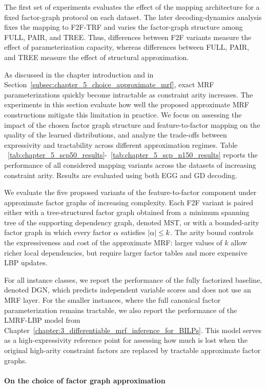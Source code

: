 The first set of experiments evaluates the effect of the mapping architecture for a fixed factor-graph protocol on each dataset. The later decoding-dynamics analysis fixes the mapping to F2F-TRF and varies the factor-graph structure among FULL, PAIR, and TREE. Thus, differences between F2F variants measure the effect of parameterization capacity, whereas differences between FULL, PAIR, and TREE measure the effect of structural approximation.

As discussed in the chapter introduction and in Section~\ref{subsec:chapter_5_choice_approximate_mrf}, exact MRF parameterizations quickly become intractable as constraint arity increases. The experiments in this section evaluate how well the proposed approximate MRF constructions mitigate this limitation in practice. We focus on assessing the impact of the chosen factor graph structure and feature-to-factor mapping on the quality of the learned distributions, and analyze the trade-offs between expressivity and tractability across different approximation regimes. Table ~\ref{tab:chapter_5_scp50_results}-~\ref{tab:chapter_5_scp_n150_results} reports the performance of all considered mapping variants across the datasets of increasing constraint arity. Results are evaluated using both EGG and GD decoding.

We evaluate the five proposed variants of the feature-to-factor component under approximate factor graphs of increasing complexity. Each F2F variant is paired either with a tree-structured factor graph obtained from a minimum spanning tree of the supporting dependency graph, denoted MST, or with a bounded-arity factor graph in which every factor $\alpha$ satisfies $|\alpha|\leq k$. The arity bound controls the expressiveness and cost of the approximate MRF: larger values of $k$ allow richer local dependencies, but require larger factor tables and more expensive LBP updates.

For all instance classes, we report the performance of the fully factorized baseline, denoted DGN, which predicts independent variable scores and does not use an MRF layer. For the smaller instances, where the full canonical factor parameterization remains tractable, we also report the performance of the LMRF-LBP model from Chapter~\ref{chapter:3_differentiable_mrf_inference_for_BILPs}. This model serves as a high-expressivity reference point for assessing how much is lost when the original high-arity constraint factors are replaced by tractable approximate factor graphs.

\paragraph{On the choice of factor graph approximation}

